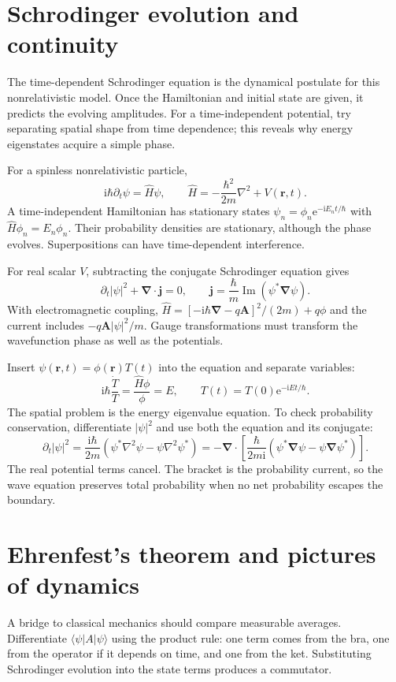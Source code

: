 \documentclass[11pt,oneside]{book}
\newcommand{\ii}{\mathrm{i}}
\newcommand{\ee}{\mathrm{e}}
\newcommand{\vect}[1]{\boldsymbol{#1}}
\newcommand{\grad}{\boldsymbol{\nabla}}
\newcommand{\lap}{\nabla^2}
\newcommand{\ket}[1]{\lvert #1\rangle}
\newcommand{\bra}[1]{\langle #1\rvert}
\theoremstyle{reviewstyle}
\begin{document}
\section{Schrodinger evolution and continuity}
The time-dependent Schrodinger equation is the dynamical postulate for this nonrelativistic model. Once the Hamiltonian and initial state are given, it predicts the evolving amplitudes. For a time-independent potential, try separating spatial shape from time dependence; this reveals why energy eigenstates acquire a simple phase.

For a spinless nonrelativistic particle,
\begin{equation}\ii\hbar\partial_t\psi=\hat H\psi,\qquad \hat H=-\frac{\hbar^2}{2m}\lap+V(\vect r,t).\end{equation}
A time-independent Hamiltonian has stationary states $\psi_n=\phi_n\ee^{-\ii E_nt/\hbar}$ with $\hat H\phi_n=E_n\phi_n$. Their probability densities are stationary, although the phase evolves. Superpositions can have time-dependent interference.

For real scalar $V$, subtracting the conjugate Schrodinger equation gives
\begin{equation}\partial_t|\psi|^2+\grad\cdot\vect j=0,\qquad \vect j=\frac\hbar m\operatorname{Im}(\psi^*\grad\psi).\end{equation}
With electromagnetic coupling, $\hat H=[-\ii\hbar\grad-q\vect A]^2/(2m)+q\phi$ and the current includes $-q\vect A|\psi|^2/m$. Gauge transformations must transform the wavefunction phase as well as the potentials.

Insert $\psi(\vect r,t)=\phi(\vect r)T(t)$ into the equation and separate variables:
\begin{equation}
\ii\hbar\frac{\dot T}{T}=\frac{\hat H\phi}{\phi}=E,
\qquad T(t)=T(0)\ee^{-\ii Et/\hbar}.
\end{equation}
The spatial problem is the energy eigenvalue equation. To check probability conservation, differentiate $|\psi|^2$ and use both the equation and its conjugate:
\begin{equation}
\partial_t|\psi|^2=
\frac{\ii\hbar}{2m}(\psi^*\lap\psi-\psi\lap\psi^*)
=-\grad\cdot\left[\frac{\hbar}{2m\ii}
(\psi^*\grad\psi-\psi\grad\psi^*)\right].
\end{equation}
The real potential terms cancel. The bracket is the probability current, so the wave equation preserves total probability when no net probability escapes the boundary.

\section{Ehrenfest's theorem and pictures of dynamics}
A bridge to classical mechanics should compare measurable averages. Differentiate $\bra\psi A\ket\psi$ using the product rule: one term comes from the bra, one from the operator if it depends on time, and one from the ket. Substituting Schrodinger evolution into the state terms produces a commutator.
\end{document}
